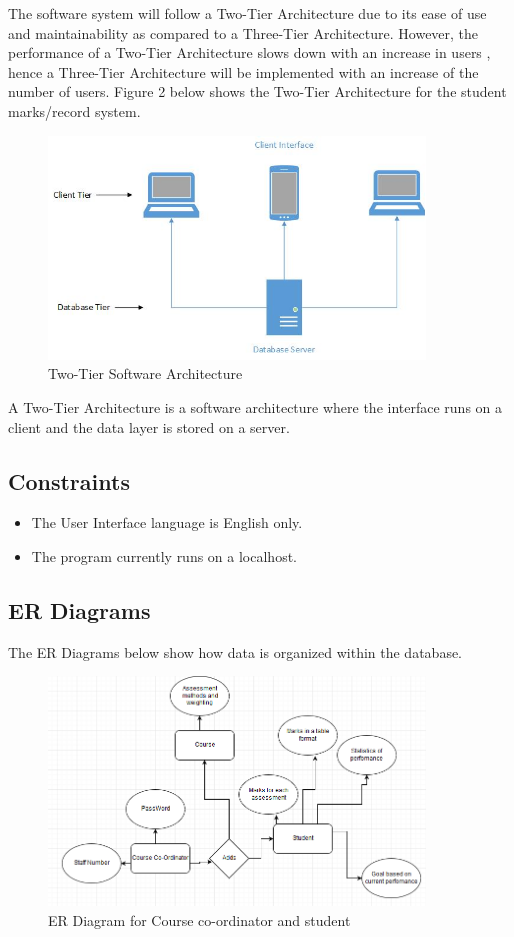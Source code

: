 \documentclass[10pt,onecolumn]{MainDocument}
\begin{document}
The software system will follow a Two-Tier Architecture due to its ease of use and maintainability as compared to a Three-Tier Architecture. However, the performance of a Two-Tier Architecture slows down with an increase in users \cite{ref3}, hence a Three-Tier Architecture will be implemented with an increase of the number of users. Figure 2 below shows the Two-Tier Architecture for the student marks/record system.   
\begin{center}
\begin{figure}[h]
\centering
\includegraphics[width=10cm]{Two-Tier}
\caption{Two-Tier Software Architecture}
\end{figure}
\end{center}

A Two-Tier Architecture is a software architecture where the interface runs on a client and the data layer is stored on a server\cite{ref4}.



\subsection{Constraints }
\begin{itemize}
\item The User Interface language is English only.
\item The program currently runs on a localhost.
\end{itemize}

\subsection{ER Diagrams }
The ER Diagrams below show how data is organized within the database.

\begin{center}
\begin{figure}[h]
\centering
\includegraphics[width=10cm]{ER1}
\caption{ER Diagram for Course co-ordinator and student}
\end{figure}
\end{center}
\end{document}
